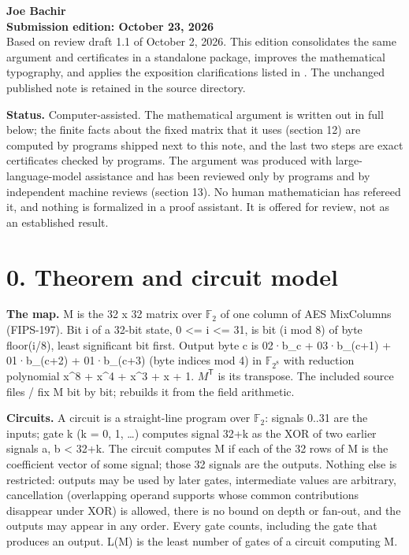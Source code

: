 \textbf{Joe Bachir}\\
\textbf{Submission edition: October 23, 2026}\\
Based on review draft 1.1 of October 2, 2026. This edition consolidates the same argument and certificates in a standalone package, improves the mathematical typography, and applies the exposition clarifications listed in \texttt{}. The unchanged published note is retained in the source directory.

\textbf{Status.} Computer-assisted. The mathematical argument is written out in full below; the finite facts about the fixed matrix that it uses (section 12) are computed by programs shipped next to this note, and the last two steps are exact certificates checked by programs. The argument was produced with large-language-model assistance and has been reviewed only by programs and by independent machine reviews (section 13). No human mathematician has refereed it, and nothing is formalized in a proof assistant. It is offered for review, not as an established result.

\hypertarget{theorem-and-circuit-model}{%
\section{0. Theorem and circuit model}\label{theorem-and-circuit-model}}

\textbf{The map.} M is the 32 x 32 matrix over \(\mathbb F_2\) of one column of AES MixColumns (FIPS-197). Bit i of a 32-bit state, 0 \textless= i \textless= 31, is bit (i mod 8) of byte floor(i/8), least significant bit first. Output byte c is 02·b\_c + 03·b\_(c+1) + 01·b\_(c+2) + 01·b\_(c+3) (byte indices mod 4) in \(\mathbb F_{2^8}\) with reduction polynomial x\^{}8 + x\^{}4 + x\^{}3 + x + 1. \(M^{\mathsf T}\) is its transpose. The included source files \texttt{} / \texttt{} fix M bit by bit; \texttt{} rebuilds it from the field arithmetic.

\textbf{Circuits.} A circuit is a straight-line program over \(\mathbb F_2\): signals 0..31 are the inputs; gate k (k = 0, 1, \ldots) computes signal 32+k as the XOR of two earlier signals a, b \textless{} 32+k. The circuit computes M if each of the 32 rows of M is the coefficient vector of some signal; those 32 signals are the outputs. Nothing else is restricted: outputs may be used by later gates, intermediate values are arbitrary, cancellation (overlapping operand supports whose common contributions disappear under XOR) is allowed, there is no bound on depth or fan-out, and the outputs may appear in any order. Every gate counts, including the gate that produces an output. L(M) is the least number of gates of a circuit computing M.

